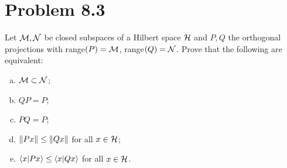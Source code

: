 \newcommand{\range}{\text{range}}

\newpage
\section{Problem 8.3}
Let $\mathcal{M}, \mathcal{N}$ be closed subspaces of a Hilbert space $\mathcal{H}$ and $P, Q$ the orthogonal projections with range$(P) = \mathcal{M}$, range$(Q) = \mathcal{N}$. Prove that the following are equivalent:
\begin{enumerate}[a)]
    \item $\mathcal{M} \subset \mathcal{N}$;
    \item $QP = P$;
    \item $PQ = P$;
    \item $\norm{Px} \leq \norm{Qx}$ for all $x \in \mathcal{H}$;
    \item $\braket{x}{Px} \leq \braket{x}{Qx}$ for all $x \in \mathcal{H}$.
\end{enumerate}
\partbreak
